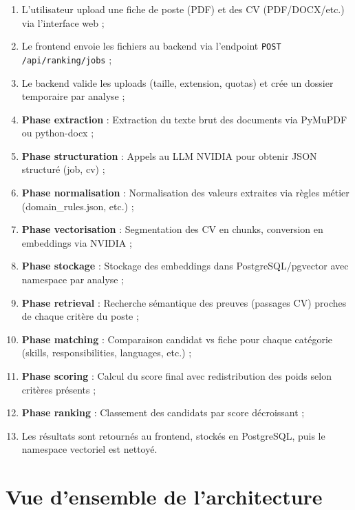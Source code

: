 \documentclass[12pt,a4paper,oneside]{book}
\begin{document}
\begin{enumerate}
    \item L'utilisateur upload une fiche de poste (PDF) et des CV (PDF/DOCX/etc.) via l'interface web ;
    \item Le frontend envoie les fichiers au backend via l'endpoint \texttt{POST /api/ranking/jobs} ;
    \item Le backend valide les uploads (taille, extension, quotas) et crée un dossier temporaire par analyse ;
    \item \textbf{Phase extraction} : Extraction du texte brut des documents via PyMuPDF ou python-docx ;
    \item \textbf{Phase structuration} : Appels au LLM NVIDIA pour obtenir JSON structuré (job, cv) ;
    \item \textbf{Phase normalisation} : Normalisation des valeurs extraites via règles métier (domain\_rules.json, etc.) ;
    \item \textbf{Phase vectorisation} : Segmentation des CV en chunks, conversion en embeddings via NVIDIA ;
    \item \textbf{Phase stockage} : Stockage des embeddings dans PostgreSQL/pgvector avec namespace par analyse ;
    \item \textbf{Phase retrieval} : Recherche sémantique des preuves (passages CV) proches de chaque critère du poste ;
    \item \textbf{Phase matching} : Comparaison candidat vs fiche pour chaque catégorie (skills, responsibilities, languages, etc.) ;
    \item \textbf{Phase scoring} : Calcul du score final avec redistribution des poids selon critères présents ;
    \item \textbf{Phase ranking} : Classement des candidats par score décroissant ;
    \item Les résultats sont retournés au frontend, stockés en PostgreSQL, puis le namespace vectoriel est nettoyé.
\end{enumerate}

\newpage


\chapter{Vue d'ensemble de l'architecture}
\end{document}
